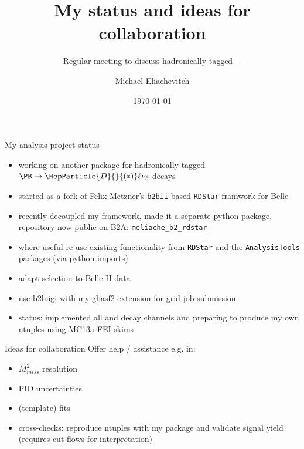 \documentclass[aspectratio=169, 16pt]{beamer}
\author{Michael Eliachevitch}
\date{\today}
\title{My status and ideas for collaboration}
\subtitle{Regular meeting to discuss hadronically tagged \PB \rightarrow \PDmstar \ell \nu_\ell}
\institute{Physikalisches Institut --- Rheinische Friedrich-Wilhelms-Universität Bonn}
\newcommand{\PDmstar}{\HepParticle{D}{}{\left(*\right)}}
\begin{document}
\maketitle
\begin{frame}[label={sec:orge64fa0b},fragile]{My analysis project status}
 \begin{itemize}
\item working on another package for hadronically tagged \(\PB \rightarrow \PDmstar \ell
  \nu_\ell\) decays
\item started as a fork of Felix Metzner's \texttt{b2bii}-based \texttt{RDStar} framwork for Belle
\item recently decoupled my framework, made it a separate python
package, repository now public on \href{https://stash.desy.de/projects/B2A/repos/meliache\_b2\_rdstar}{B2A: \texttt{meliache\_b2\_rdstar}}
\item where useful re-use existing functionality from \texttt{RDStar} and the \texttt{AnalysisTools}
packages (via python imports)
\item adapt selection to Belle II data
\item use b2luigi with my \href{https://meliache.github.io/b2luigi/docs/\_build/html/usage/batch.html\#gbasf2-wrapper-for-lcg-jobs}{gbasf2 extension} for grid job submission
\item status: implemented all \PD and \PDstar decay channels and preparing to produce my own
ntuples using MC13a FEI-skims
\end{itemize}
\end{frame}

\begin{frame}[label={sec:org64e2821}]{Ideas for collaboration}
Offer help / assistance e.g. in: 
\begin{itemize}
\item \(M_{miss}^2\) resolution
\item PID uncertainties
\item (template) fits
\item cross-checks: reproduce ntuples with my package and validate signal yield\\
(requires cut-flows for interpretation)
\end{itemize}
\end{frame}
\end{document}
